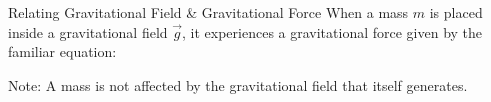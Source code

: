 \documentclass[12pt,compress,aspectratio=169]{beamer}
\begin{document}
\begin{frame}{Relating Gravitational Field \& Gravitational Force}
  When a mass $m$ is placed inside a gravitational field $\vec g$, it
  experiences a gravitational force given by the familiar equation:

  Note: A mass is not affected by the gravitational field that itself
  generates.
\end{frame}
\end{document}
